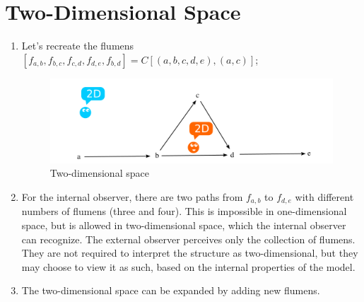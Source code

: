 \documentclass[final]{article}
\begin{document}
    \section{Two-Dimensional Space}
        \begin{enumerate}

            \item Let's recreate the flumens \(
            [f_{a,b},f_{b,c},f_{c,d},f_{d,e},f_{b,d}]=C[(a,b,c,d,e),(a,c)] \);

            \begin{figure}[H]
                \centering
                \includegraphics[width=\textwidth]{./2d-f1f2f3.png}
                \caption{Two-dimensional space}
                \label{fig:image}
            \end{figure}

            \item For the internal observer, there are two paths from \( f_{a,b} \) to \( f_{d,e} \)
            with different numbers of flumens (three and four). This is impossible in one-dimensional space,
            but is allowed in two-dimensional space, which the internal observer can recognize. The external observer perceives only
            the collection of flumens. They are not required to interpret the structure as
            two-dimensional, but they may choose to view it as such, based on the internal properties of the model.

            \item The two-dimensional space can be expanded by adding new flumens.

        \end{enumerate}
\end{document}

